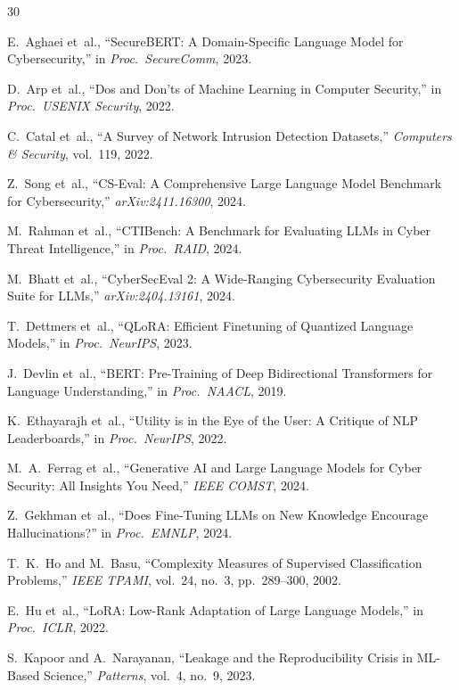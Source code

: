 \documentclass[journal]{IEEEtran}
\begin{document}
\begin{thebibliography}{30}

E.~Aghaei et~al., ``SecureBERT: A Domain-Specific Language Model for Cybersecurity,'' in \emph{Proc.\ SecureComm}, 2023.

D.~Arp et~al., ``Dos and Don'ts of Machine Learning in Computer Security,'' in \emph{Proc.\ USENIX Security}, 2022.

C.~Catal et~al., ``A Survey of Network Intrusion Detection Datasets,'' \emph{Computers \& Security}, vol.~119, 2022.

Z.~Song et~al., ``CS-Eval: A Comprehensive Large Language Model Benchmark for Cybersecurity,'' \emph{arXiv:2411.16300}, 2024.

M.~Rahman et~al., ``CTIBench: A Benchmark for Evaluating LLMs in Cyber Threat Intelligence,'' in \emph{Proc.\ RAID}, 2024.

M.~Bhatt et~al., ``CyberSecEval 2: A Wide-Ranging Cybersecurity Evaluation Suite for LLMs,'' \emph{arXiv:2404.13161}, 2024.

T.~Dettmers et~al., ``QLoRA: Efficient Finetuning of Quantized Language Models,'' in \emph{Proc.\ NeurIPS}, 2023.

J.~Devlin et~al., ``BERT: Pre-Training of Deep Bidirectional Transformers for Language Understanding,'' in \emph{Proc.\ NAACL}, 2019.

K.~Ethayarajh et~al., ``Utility is in the Eye of the User: A Critique of NLP Leaderboards,'' in \emph{Proc.\ NeurIPS}, 2022.

M.~A.~Ferrag et~al., ``Generative AI and Large Language Models for Cyber Security: All Insights You Need,'' \emph{IEEE COMST}, 2024.

Z.~Gekhman et~al., ``Does Fine-Tuning LLMs on New Knowledge Encourage Hallucinations?'' in \emph{Proc.\ EMNLP}, 2024.

T.~K.~Ho and M.~Basu, ``Complexity Measures of Supervised Classification Problems,'' \emph{IEEE TPAMI}, vol.~24, no.~3, pp.~289--300, 2002.

E.~Hu et~al., ``LoRA: Low-Rank Adaptation of Large Language Models,'' in \emph{Proc.\ ICLR}, 2022.

S.~Kapoor and A.~Narayanan, ``Leakage and the Reproducibility Crisis in ML-Based Science,'' \emph{Patterns}, vol.~4, no.~9, 2023.


\end{thebibliography}
\end{document}
